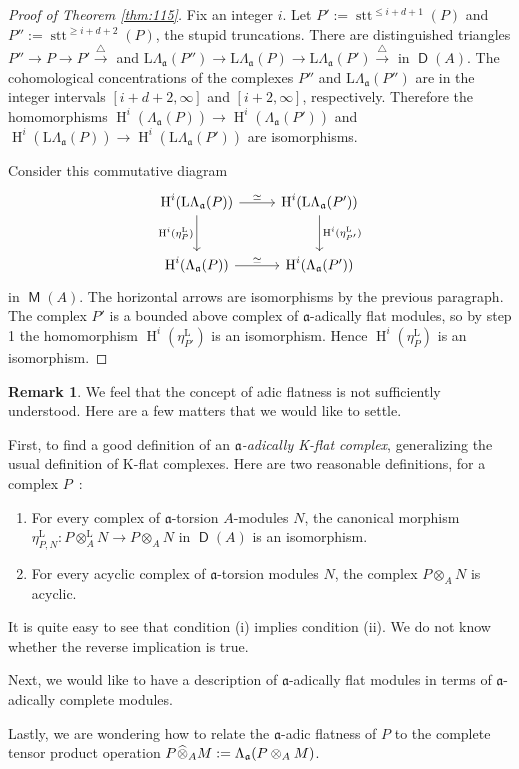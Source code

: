 \documentclass[10pt]{amsart}
\theoremstyle{definition}
\newtheorem{rem}[equation]{Remark}
\numberwithin{equation}{section}
\newcommand{\xar}{\xrightarrow}
\newcommand{\opn}{\operatorname}
\newcommand{\cat}[1]{\operatorname{\mathsf{#1}}}
\newcommand{\rmitem}[1]{\item[\textrm{(#1)}]}
\newcommand{\mfrak}[1]{\mathfrak{#1}}
\newcommand{\mrm}[1]{\mathrm{#1}}
\newcommand{\La}{\Lambda}
\renewcommand{\a}{\mfrak{a}}
\newcommand{\ot}{\otimes}
\newcommand{\wh}[1]{\widehat{#1}}
\newcommand{\msp}[1]{\mspace{#1 mu}}
\begin{document}
\begin{proof}[Proof of Theorem {\rm \ref{thm:115}}]
Fix an integer $i$. Let
$P' := \opn{stt}^{\leq i + d + 1}(P)$ and
$P'' := \opn{stt}^{\geq i + d + 2}(P)$, the stupid truncations.
There are distinguished triangles
$P'' \to P \to P' \xar{\triangle}$
and
$\mrm{L} \La_{\a}(P'') \to \mrm{L} \La_{\a}(P) \to
\mrm{L} \La_{\a}(P') \xar{\triangle}$
in $\cat{D}(A)$.
The cohomological concentrations of the complexes $P''$
and $\mrm{L} \La_{\a}(P'')$ are in the integer intervals
$[i + d + 2, \infty]$ and $[i + 2, \infty]$, respectively.
Therefore the homomorphisms
$\opn{H}^i(\La_{\a}(P)) \to \opn{H}^i(\La_{\a}(P'))$
and
$\opn{H}^i(\mrm{L} \La_{\a}(P)) \to \opn{H}^i(\mrm{L} \La_{\a}(P'))$
are isomorphisms.

Consider this commutative diagram
\[ \begin{tikzcd} [column sep = 6ex, row sep = 6ex]
\opn{H}^i(\mrm{L} \La_{\a}(P))
\ar[r, "{\simeq}"]
\ar[d, "{\opn{H}^i(\eta^{\mrm{L}}_{P})}"']
&
\opn{H}^i(\mrm{L} \La_{\a}(P'))
\ar[d, "{\opn{H}^i(\eta^{\mrm{L}}_{P'})}"]
\\
\opn{H}^i(\La_{\a}(P))
\ar[r, "{\simeq}"]
&
\opn{H}^i(\La_{\a}(P'))
\end{tikzcd} \]
in $\cat{M}(A)$. The horizontal arrows are isomorphisms by the previous
paragraph.
The complex $P'$ is a bounded above complex of $\a$-adically flat modules, so
by step 1 the homomorphism
$\opn{H}^i(\eta^{\mrm{L}}_{P'})$ is an isomorphism.
Hence
$\opn{H}^i(\eta^{\mrm{L}}_{P})$ is an isomorphism.
\end{proof}

\begin{rem}
We feel that the concept of adic flatness is not sufficiently understood.
Here are a few matters that we would like to settle.

First, to find a good definition of an {\em $\a$-adically K-flat
complex}, generalizing the usual definition of K-flat complexes.
Here are two reasonable definitions, for a complex $P$~:
\begin{enumerate}
\rmitem{i}For every complex of $\a$-torsion $A$-modules $N$, the canonical
morphism
$\eta^{\mrm{L}}_{P, N} :  P \ot^{\mrm{L}}_A N \to P \ot_A N$
in $\cat{D}(A)$ is an isomorphism.

\rmitem{ii}For every acyclic complex of $\a$-torsion modules $N$, the
complex $P \ot_A N$ is acyclic.
\end{enumerate}
It is quite easy to see that condition (i) implies condition (ii).
We do not know whether the reverse implication is true.

Next, we would like to have a description of $\a$-adically flat modules in
terms of $\a$-adically complete modules.

Lastly, we are wondering how to relate the $\a$-adic flatness of
$P$ to the complete tensor product operation
$P \msp{1} \wh{\ot}_{A} M := \La_{\a}(P \ot_A M)$.
\end{rem}
\end{document}
